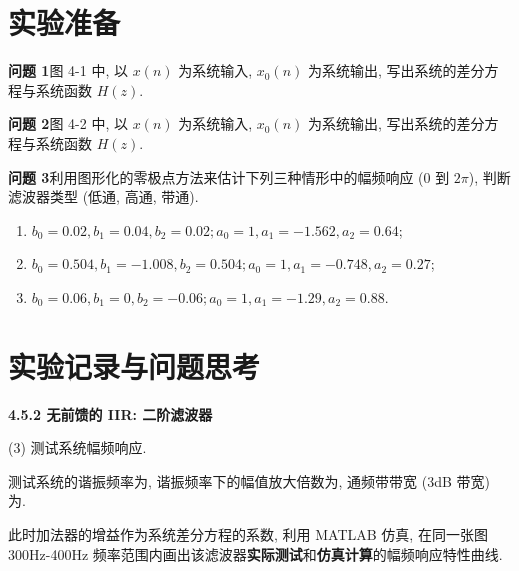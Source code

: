 \documentclass{dspreport}
\begin{document}
\maketitle

\section{实验准备}
\textbf{问题 1}\quad 图 4-1 中, 以 $x(n)$ 为系统输入, $x_0(n)$ 为系统输出, 写出系统的差分方程与系统函数 $H(z)$.

\begin{block}

\end{block}

\textbf{问题 2}\quad 图 4-2 中, 以 $x(n)$ 为系统输入, $x_0(n)$ 为系统输出, 写出系统的差分方程与系统函数 $H(z)$.

\begin{block}

\end{block}

\textbf{问题 3}\quad 利用图形化的零极点方法来估计下列三种情形中的幅频响应 (0 到 $2\pi$), 判断滤波器类型 (低通, 高通, 带通).
\begin{enumerate}[(1)]
    \item $b_0=0.02, b_1=0.04, b_2=0.02; a_0=1, a_1=-1.562, a_2=0.64$;
    \item $b_0=0.504, b_1=-1.008, b_2=0.504; a_0=1, a_1=-0.748, a_2=0.27$;
    \item $b_0=0.06, b_1=0, b_2=-0.06; a_0=1, a_1=-1.29, a_2=0.88$.
\end{enumerate}

\section{实验记录与问题思考}
\noindent\textbf{4.5.2 无前馈的 IIR: 二阶滤波器}

(3) 测试系统幅频响应.

测试系统的谐振频率为\underline{\blank{  }}, 谐振频率下的幅值放大倍数为\underline{\blank{  }}, 通频带带宽 (3dB 带宽) 为\underline{\blank{  }}.

此时加法器的增益作为系统差分方程的系数, 利用 MATLAB 仿真, 在同一张图 300Hz-400Hz 频率范围内画出该滤波器\textbf{实际测试}和\textbf{仿真计算}的幅频响应特性曲线.
\end{document}
